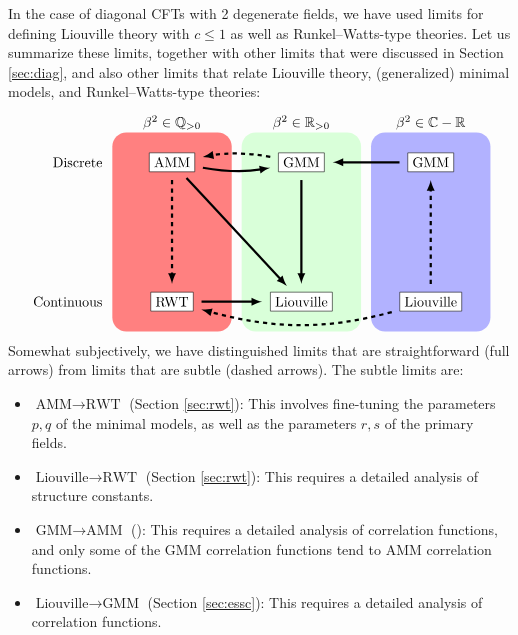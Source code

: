 \documentclass[12pt, a4paper]{article}
\theoremstyle{break}
\begin{document}
In the case of diagonal CFTs with 2 degenerate fields, we have used limits for defining Liouville theory with $c\leq 1$ as well as Runkel--Watts-type theories. Let us summarize these limits, together with other limits that were discussed 
in Section \ref{sec:diag}, and also other limits that relate Liouville theory, (generalized) minimal models, and Runkel--Watts-type theories: 
\begin{align}
\begin{tikzpicture}[scale = .25, baseline=(current  bounding  box.center)]
\fill[red!50, rounded corners = 10] (-6, -10) rectangle (6, 10);
\fill[green!15, rounded corners = 10] (7, -10) rectangle (19, 10);
\fill[blue!30, rounded corners = 10] (20, -10) rectangle (32, 10);
\node at (0, 11) {$\beta^2\in\mathbb{Q}_{>0}$};
\node at (13, 11) {$\beta^2\in\mathbb{R}_{>0}$};
\node at (26, 11) {$\beta^2\in \mathbb{C}-\mathbb{R}$};
\node[left] at (-6.5, 7) {Discrete};
\node[left] at (-6.5, -7) {Continuous};
\draw (0, 7) node[draw, fill = white] (mm) {AMM};
\draw (13, 7) node[draw, fill = white] (gmm1) {GMM};
\draw (26, 7) node[draw, fill = white] (gmm2) {GMM};
\draw (0, -7) node[draw, fill = white] (rwt) {RWT};
\draw (13, -7) node[draw, fill = white] (clo) {Liouville};
\draw (26, -7) node[draw, fill = white] (liou) {Liouville};
\draw [ultra thick, shorten <= 2mm, shorten >= 2mm, -latex, 
       out = -10, in = -170] (mm) to (gmm1);
\draw [ultra thick, shorten <= 2mm, shorten >= 2mm, -latex, dashed,
       out = 170, in = 10] (gmm1) to (mm);
\draw [ultra thick, shorten <= 2mm, shorten >= 2mm, -latex] (gmm2) to (gmm1);
\draw [ultra thick, shorten <= 2mm, shorten >= 2mm, -latex] (mm) to (clo);
\draw [ultra thick, shorten <= 2mm, shorten >= 2mm, -latex, dashed] (mm) to (rwt);
\draw [ultra thick, shorten <= 2mm, shorten >= 2mm, -latex] (rwt) to (clo);
\draw [ultra thick, shorten <= 2mm, shorten >= 2mm, -latex] (gmm1) to (clo);
\draw [ultra thick, shorten <= 2mm, shorten >= 2mm, -latex,
       out = -165, in = -15, dashed] (liou) to (rwt);
\draw [ultra thick, shorten <= 2mm, shorten >= 2mm, -latex, dashed] (liou) to (gmm2);
\end{tikzpicture}
\label{lims}
\end{align}
Somewhat subjectively, we have distinguished limits that are straightforward (full arrows) from limits that are subtle (dashed arrows). The subtle limits are:
\begin{itemize}
 \item $\boxed{\text{AMM}\to \text{RWT}}$ (Section \ref{sec:rwt}): This involves fine-tuning the parameters $p,q$ of the minimal models, as well as the parameters $r,s$ of the primary fields.
  \item $\boxed{\text{Liouville}\to \text{RWT}}$ (Section \ref{sec:rwt}): This requires a detailed analysis of structure constants. 
 \item $\boxed{\text{GMM}\to \text{AMM}}$ (\cite{rib18}): This requires a detailed analysis of correlation functions, and only some of the GMM correlation functions tend to AMM correlation functions. 
 \item $\boxed{\text{Liouville}\to \text{GMM}}$ (Section \ref{sec:essc}): This requires a detailed analysis of correlation functions.
\end{itemize}
\end{document}
